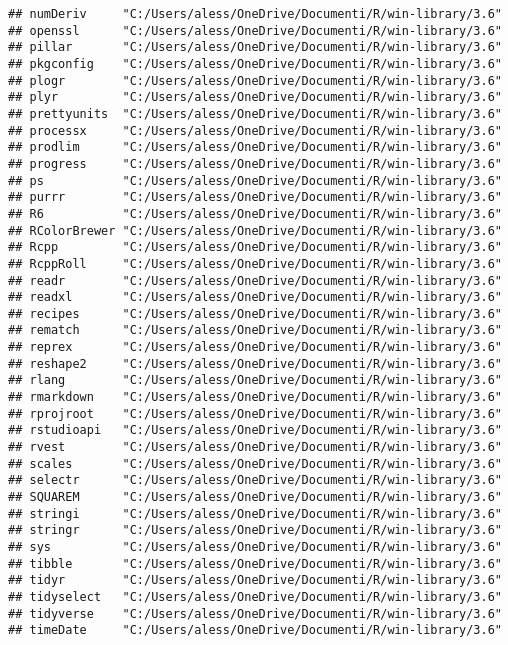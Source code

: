 \documentclass[]{article}
\begin{document}
\begin{verbatim}
## numDeriv     "C:/Users/aless/OneDrive/Documenti/R/win-library/3.6"
## openssl      "C:/Users/aless/OneDrive/Documenti/R/win-library/3.6"
## pillar       "C:/Users/aless/OneDrive/Documenti/R/win-library/3.6"
## pkgconfig    "C:/Users/aless/OneDrive/Documenti/R/win-library/3.6"
## plogr        "C:/Users/aless/OneDrive/Documenti/R/win-library/3.6"
## plyr         "C:/Users/aless/OneDrive/Documenti/R/win-library/3.6"
## prettyunits  "C:/Users/aless/OneDrive/Documenti/R/win-library/3.6"
## processx     "C:/Users/aless/OneDrive/Documenti/R/win-library/3.6"
## prodlim      "C:/Users/aless/OneDrive/Documenti/R/win-library/3.6"
## progress     "C:/Users/aless/OneDrive/Documenti/R/win-library/3.6"
## ps           "C:/Users/aless/OneDrive/Documenti/R/win-library/3.6"
## purrr        "C:/Users/aless/OneDrive/Documenti/R/win-library/3.6"
## R6           "C:/Users/aless/OneDrive/Documenti/R/win-library/3.6"
## RColorBrewer "C:/Users/aless/OneDrive/Documenti/R/win-library/3.6"
## Rcpp         "C:/Users/aless/OneDrive/Documenti/R/win-library/3.6"
## RcppRoll     "C:/Users/aless/OneDrive/Documenti/R/win-library/3.6"
## readr        "C:/Users/aless/OneDrive/Documenti/R/win-library/3.6"
## readxl       "C:/Users/aless/OneDrive/Documenti/R/win-library/3.6"
## recipes      "C:/Users/aless/OneDrive/Documenti/R/win-library/3.6"
## rematch      "C:/Users/aless/OneDrive/Documenti/R/win-library/3.6"
## reprex       "C:/Users/aless/OneDrive/Documenti/R/win-library/3.6"
## reshape2     "C:/Users/aless/OneDrive/Documenti/R/win-library/3.6"
## rlang        "C:/Users/aless/OneDrive/Documenti/R/win-library/3.6"
## rmarkdown    "C:/Users/aless/OneDrive/Documenti/R/win-library/3.6"
## rprojroot    "C:/Users/aless/OneDrive/Documenti/R/win-library/3.6"
## rstudioapi   "C:/Users/aless/OneDrive/Documenti/R/win-library/3.6"
## rvest        "C:/Users/aless/OneDrive/Documenti/R/win-library/3.6"
## scales       "C:/Users/aless/OneDrive/Documenti/R/win-library/3.6"
## selectr      "C:/Users/aless/OneDrive/Documenti/R/win-library/3.6"
## SQUAREM      "C:/Users/aless/OneDrive/Documenti/R/win-library/3.6"
## stringi      "C:/Users/aless/OneDrive/Documenti/R/win-library/3.6"
## stringr      "C:/Users/aless/OneDrive/Documenti/R/win-library/3.6"
## sys          "C:/Users/aless/OneDrive/Documenti/R/win-library/3.6"
## tibble       "C:/Users/aless/OneDrive/Documenti/R/win-library/3.6"
## tidyr        "C:/Users/aless/OneDrive/Documenti/R/win-library/3.6"
## tidyselect   "C:/Users/aless/OneDrive/Documenti/R/win-library/3.6"
## tidyverse    "C:/Users/aless/OneDrive/Documenti/R/win-library/3.6"
## timeDate     "C:/Users/aless/OneDrive/Documenti/R/win-library/3.6"

\end{verbatim}
\end{document}
